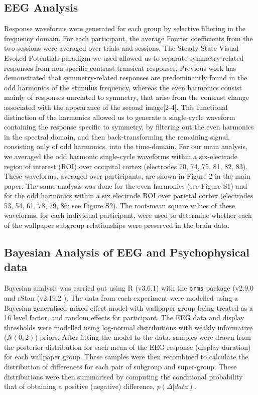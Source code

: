 \documentclass[9pt,twocolumn,twoside,lineno]{pnas-new}
\begin{document}
\subsection*{EEG Analysis}
Response waveforms were generated for each group by selective filtering in the frequency domain. For each participant, the average Fourier coefficients from the two sessions were averaged over trials and sessions. The Steady-State Visual Evoked Potentials paradigm we used allowed us to separate symmetry-related responses from non-specific contrast transient responses. Previous work has demonstrated that symmetry-related responses are predominantly found in the odd harmonics of the stimulus frequency, whereas the even harmonics consist mainly of responses unrelated to symmetry, that arise from the contrast change associated with the appearance of the second image[2-4]. This functional distinction of the harmonics allowed us to generate a single-cycle waveform containing the response specific to symmetry, by filtering out the even harmonics in the spectral domain, and then back-transforming the remaining signal, consisting only of odd harmonics, into the time-domain. For our main analysis, we averaged the odd harmonic single-cycle waveforms within a six-electrode region of interest (ROI) over occipital cortex (electrodes 70, 74, 75, 81, 82, 83). These waveforms, averaged over participants, are shown in Figure 2 in the main paper. The same analysis was done for the even harmonics (see Figure S1) and for the odd harmonics within a six electrode ROI over parietal cortex (electrodes 53, 54, 61, 78, 79, 86; see Figure S2). The root-mean square values of these waveforms, for each individual participant, were used to determine whether each of the wallpaper subgroup relationships were preserved in the brain data.  

\subsection*{Bayesian Analysis of EEG and Psychophysical data}
Bayesian analysis was carried out using R (v3.6.1) \cite{R} with the \texttt{brms} package (v2.9.0 \cite{burkner2017} and rStan (v2.19.2 \cite{rStan}). The data from each experiment were modelled using a Bayesian generalised mixed effect model with wallpaper group being treated as a 16 level factor, and random effects for participant. The EEG data and display thresholds were modelled using log-normal distributions with weakly informative ($N(0, 2)$) priors. After fitting the model to the data, samples were drawn from the posterior distribution for each mean of the EEG response (display duration) for each wallpaper group. These samples were then recombined to calculate the distribution of differences for each pair of subgroup and super-group. These distributions were then summarised by computing the conditional probability that of obtaining a positive (negative) difference, $p(\Delta | data)$.
\end{document}
